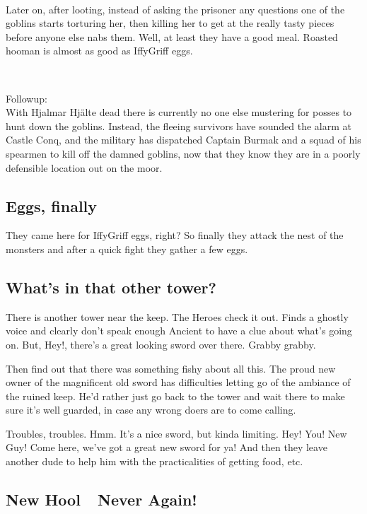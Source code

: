 \

Later on, after looting, instead of asking the prisoner any questions one of the goblins starts torturing her, then killing her to get at the really tasty pieces before anyone else nabs them. Well, at least they have a good meal. Roasted hooman is almost as good as IffyGriff eggs.

\

Followup:\\
With Hjalmar Hjälte dead there is currently no one else mustering for posses to hunt down the goblins. Instead, the fleeing survivors have sounded the alarm at Castle Conq, and the military has dispatched Captain Burmak and a squad of his spearmen to kill off the damned goblins, now that they know they are in a poorly defensible location out on the moor.


\subsection*{Eggs, finally}

They came here for IffyGriff eggs, right? So finally they attack the nest of the monsters and after a quick fight they gather a few eggs.


\subsection*{What's in that other tower?}

There is another tower near the keep. The Heroes check it out. Finds a ghostly voice and clearly don't speak enough Ancient to have a clue about what's going on. But, Hey!, there's a great looking sword over there. Grabby grabby.

Then find out that there was something fishy about all this. The proud new owner of the magnificent old sword has difficulties letting go of the ambiance of the ruined keep. He'd rather just go back to the tower and wait there to make sure it's well guarded, in case any wrong doers are to come calling.

Troubles, troubles. Hmm. It's a nice sword, but kinda limiting. Hey! You! New Guy! Come here, we've got a great new sword for ya! And then they leave another dude to help him with the practicalities of getting food, etc.


\subsection*{New Hool~\mdash~Never Again!}

